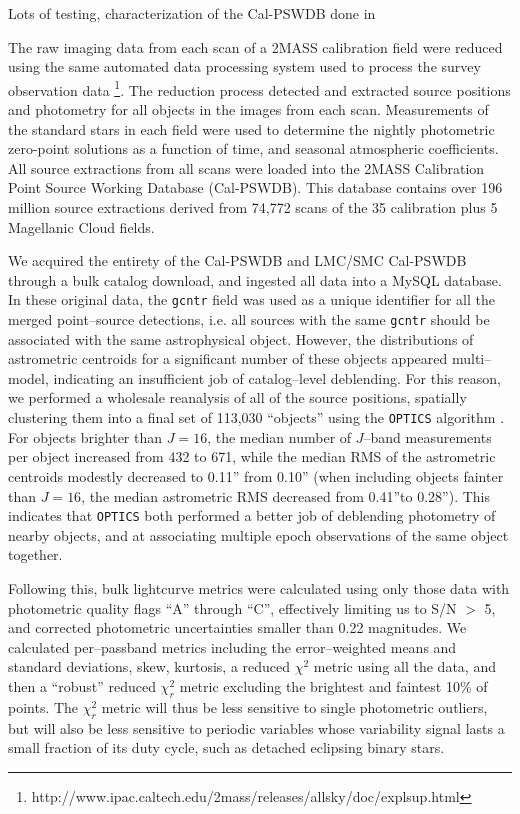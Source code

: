 \documentclass[]{emulateapj}
\begin{document}
Lots of testing, characterization of the Cal-PSWDB done in \citep{plavchanphd,plavchan2008a}

The raw imaging data from each scan of a 2MASS calibration field were reduced using the same automated data processing system used to process the survey observation data \footnote{http://www.ipac.caltech.edu/2mass/releases/allsky/doc/explsup.html}. The reduction process detected and extracted source positions and photometry for all objects in the images from each scan. Measurements of the standard stars in each field were used to determine the nightly photometric zero-point solutions as a function of time, and seasonal atmospheric coefficients. All source extractions from all scans were loaded into the 2MASS Calibration Point Source Working Database (Cal-PSWDB). This database contains over 196 million source extractions derived from 74,772 scans of the 35 calibration plus 5 Magellanic Cloud fields. 

We acquired the entirety of the Cal-PSWDB and LMC/SMC Cal-PSWDB
through a bulk catalog download, and ingested all data into a MySQL
database.  In these original data, the {\tt gcntr} field was used as a
unique identifier for all the merged point--source detections,
i.e. all sources with the same {\tt gcntr} should be associated with
the same astrophysical object.  However, the distributions of
astrometric centroids for a significant number of these objects
appeared multi--model, indicating an insufficient job of
catalog--level deblending.  For this reason, we performed a wholesale
reanalysis of all of the source positions, spatially clustering them
into a final set of 113,030 ``objects'' using the {\tt OPTICS}
algorithm \cite{optics}.
%
For objects brighter than $J=16$, the median number of $J$--band
measurements per object increased from 432 to 671, while the median
RMS of the astrometric centroids modestly decreased to 0.11'' from
0.10'' (when including objects fainter than $J=16$, the median
astrometric RMS decreased from 0.41''to 0.28'').  This indicates that
{\tt OPTICS} both performed a better job of deblending photometry of
nearby objects, and at associating multiple epoch observations of the
same object together.
%

Following this, bulk lightcurve metrics were calculated using only
those data with photometric quality flags ``A'' through ``C'',
effectively limiting us to S/N $>$ 5, and corrected photometric
uncertainties smaller than 0.22 magnitudes.  We calculated
per--passband metrics including the error--weighted means and standard
deviations, skew, kurtosis, a reduced $\chi^2$ metric using all the
data, and then a ``robust'' reduced $\chi^2_r$ metric excluding the
brightest and faintest 10\% of points.  The $\chi^2_r$ metric will
thus be less sensitive to single photometric outliers, but will also
be less sensitive to periodic variables whose variability signal lasts
a small fraction of its duty cycle, such as detached eclipsing binary
stars.
\end{document}

